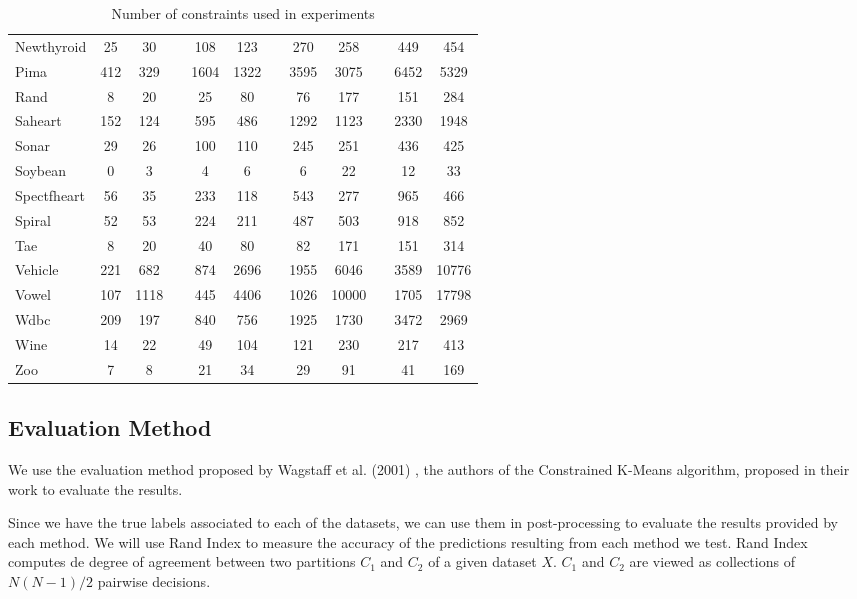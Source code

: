 \documentclass[review]{elsarticle}
\begin{document}
\begin{table}[!h]
{\begin{tabular}{lcc c cc c cc c cc}
		Newthyroid & 25 & 30 && 108 & 123 && 270 & 258 && 449 & 454 \\
		Pima & 412 & 329 && 1604 & 1322 && 3595 & 3075 && 6452 & 5329 \\
		Rand & 8 & 20 && 25 & 80 && 76 & 177 && 151 & 284 \\
		Saheart & 152 & 124 && 595 & 486 && 1292 & 1123 && 2330 & 1948 \\
		Sonar & 29 & 26 && 100 & 110 && 245 & 251 && 436 & 425 \\
		Soybean & 0 & 3 && 4 & 6 && 6 & 22 && 12 & 33 \\
		Spectfheart & 56 & 35 && 233 & 118 && 543 & 277 && 965 & 466 \\
		Spiral & 52 & 53 && 224 & 211 && 487 & 503 && 918 & 852 \\
		Tae & 8 & 20 && 40 & 80 && 82 & 171 && 151 & 314 \\
		Vehicle & 221 & 682 && 874 & 2696 && 1955 & 6046 && 3589 & 10776 \\
		Vowel & 107 & 1118 && 445 & 4406 && 1026 & 10000 && 1705 & 17798 \\
		Wdbc & 209 & 197 && 840 & 756 && 1925 & 1730 && 3472 & 2969 \\
		Wine & 14 & 22 && 49 & 104 && 121 & 230 && 217 & 413 \\
		Zoo & 7 & 8 && 21 & 34 && 29 & 91 && 41 & 169 \\
		\hline

	\end{tabular}}

	\caption{Number of constraints used in experiments}
	\label{tab:constraints}
\end{table}

\subsection{Evaluation Method}

We use the evaluation method proposed by Wagstaff et al. (2001) \cite{wagstaff2001constrained}, the authors of the Constrained K-Means algorithm, proposed in their work to evaluate the results.

Since we have the true labels associated to each of the datasets, we can use them in post-processing to evaluate the results provided by each method. We will use Rand Index \cite{rand1971objective} to measure the accuracy of the predictions resulting from each method we test. Rand Index computes de degree of agreement between two partitions $C_1$ and $C_2$ of a given dataset $X$. $C_1$ and $C_2$ are viewed as collections of $N(N - 1)/2$ pairwise decisions.
\end{document}
